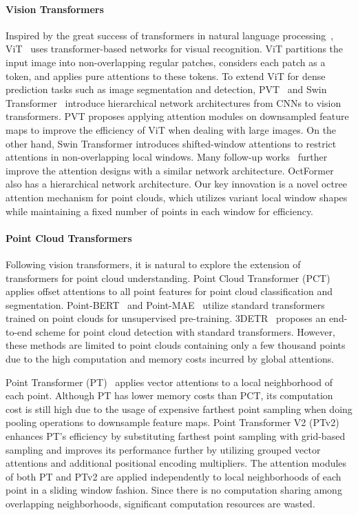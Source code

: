 \documentclass[acmtog,screen,authorversion]{acmart}
\begin{document}
\paragraph{Vision Transformers}
Inspired by the great success of transformers in natural language processing~\cite{Vaswani2017}, ViT~\cite{Dosovitskiy2021} uses transformer-based networks for visual recognition.
ViT partitions the input image into non-overlapping regular patches, considers each patch as a token, and applies pure attentions to these tokens.
To extend ViT for dense prediction tasks such as image segmentation and detection, PVT~\cite{Wang2021c} and Swin Transformer~\cite{Liu2021a} introduce hierarchical network architectures from CNNs to vision transformers.
PVT proposes applying attention modules on downsampled feature maps to improve the efficiency of ViT when dealing with large images.
On the other hand, Swin Transformer introduces shifted-window attentions to restrict attentions in non-overlapping local windows.
Many follow-up works~\cite{Chu2021a,Dong2022,Wang2022a,Yang2021} further improve the attention designs with a similar network architecture.
OctFormer also has a hierarchical network architecture.
Our key innovation is a novel octree attention mechanism for point clouds, which utilizes variant local window shapes while maintaining a fixed number of points in each window for efficiency.


\paragraph{Point Cloud Transformers}
Following vision transformers, it is natural to explore the extension of transformers for point cloud understanding.
Point Cloud Transformer (PCT)~\cite{Guo2021} applies offset attentions to all point features for point cloud classification and segmentation.
Point-BERT~\cite{Yu2022} and Point-MAE~\cite{Pang2022} utilize standard transformers trained on point clouds for unsupervised pre-training.
3DETR~\cite{Misra2021} proposes an end-to-end scheme for point cloud detection with standard transformers.
However, these methods are limited to point clouds containing only a few thousand points due to the high computation and memory costs incurred by global attentions.

Point Transformer (PT)~\cite{Zhao2021} applies vector attentions to a local neighborhood of each point.
Although PT has lower memory costs than PCT, its computation cost is still high due to the usage of expensive farthest point sampling when doing pooling operations to downsample feature maps.
Point Transformer V2 (PTv2)~\cite{Wu2022} enhances PT's efficiency by substituting farthest point sampling with grid-based sampling and improves its performance further by utilizing grouped vector attentions and additional positional encoding multipliers.
The attention modules of both PT and PTv2 are applied independently to local neighborhoods of each point in a sliding window fashion.
Since there is no computation sharing among overlapping neighborhoods, significant computation resources are wasted.  
\end{document}
